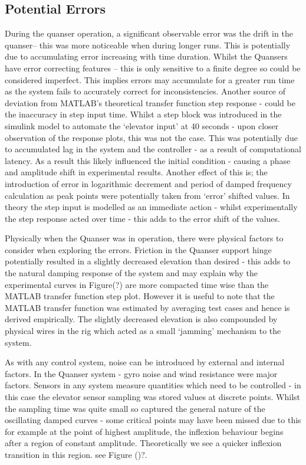 \subsection{Potential Errors}\label{potential-errors}

During the quanser operation, a significant observable error was the
drift in the quanser-- this was more noticeable when during longer runs.
This is potentially due to accumulating error increasing with time
duration. Whilst the Quansers have error correcting features -- this is
only sensitive to a finite degree so could be considered imperfect. This
implies errors may accumulate for a greater run time as the system fails
to accurately correct for inconsistencies. Another source of deviation
from MATLAB's theoretical transfer function step response - could be the
inaccuracy in step input time. Whilst a step block was introduced in the
simulink model to automate the `elevator input' at 40 seconds - upon
closer observation of the response plots, this was not the case. This
was potentially due to accumulated lag in the system and the controller
- as a result of computational latency. As a result this likely
influenced the initial condition - causing a phase and amplitude shift
in experimental results. Another effect of this is; the introduction of
error in logarithmic decrement and period of damped frequency
calculation as peak points were potentially taken from `error' shifted
values. In theory the step input is modelled as an immediate action -
whilst experimentally the step response acted over time - this adds to
the error shift of the values.

Physically when the Quanser was in operation, there were physical
factors to consider when exploring the errors. Friction in the Quanser
support hinge potentially resulted in a slightly decreased elevation
than desired - this adds to the natural damping response of the system
and may explain why the experimental curves in Figure(?) are more
compacted time wise than the MATLAB transfer function step plot. However
it is useful to note that the MATLAB transfer function was estimated by
averaging test cases and hence is derived empirically. The slightly
decreased elevation is also compounded by physical wires in the rig
which acted as a small `jamming' mechanism to the system.

As with any control system, noise can be introduced by external and
internal factors. In the Quanser system - gyro noise and wind resistance
were major factors. Sensors in any system measure quantities which need
to be controlled - in this case the elevator sensor sampling was stored
values at discrete points. Whilst the sampling time was quite small so
captured the general nature of the oscillating damped curves - some
critical points may have been missed due to this for example at the
point of highest amplitude, the inflexion behaviour begins after a
region of constant amplitude. Theoretically we see a quicker inflexion
transition in this region. see Figure ()?.

